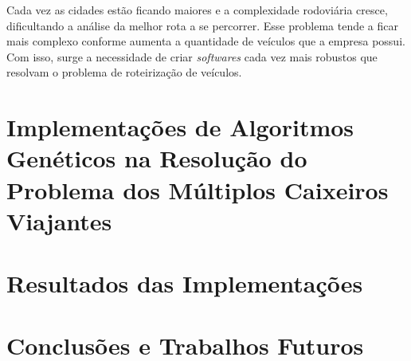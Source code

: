 \documentclass[final,5p,times,twocolumn]{elsarticle}
\begin{document}
	Cada vez as cidades estão ficando maiores e a complexidade rodoviária cresce, dificultando a
	análise da melhor rota a se percorrer. Esse problema tende a ficar mais complexo conforme 
	aumenta a quantidade de veículos que a empresa possui. Com isso, surge a necessidade de criar 
	\textit{softwares} cada vez mais robustos que resolvam o problema de roteirização de veículos.

	
\section {Implementações de Algoritmos Genéticos na Resolução do Problema dos Múltiplos Caixeiros Viajantes}

\section {Resultados das Implementações}
		

\section{Conclusões e Trabalhos Futuros}








\end{document}
